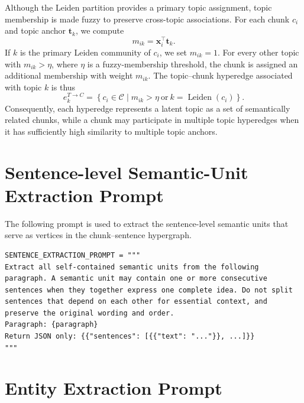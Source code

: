 \documentclass[a4paper,fleqn]{cas-dc}
\begin{document}
Although the Leiden partition provides a primary topic assignment, topic membership is made fuzzy to preserve cross-topic associations. For each chunk $c_i$ and topic anchor $\mathbf{t}_k$, we compute
\begin{equation}
m_{ik}=\mathbf{x}_i^{\top}\mathbf{t}_k.
\end{equation}
If $k$ is the primary Leiden community of $c_i$, we set $m_{ik}=1$. For every other topic with $m_{ik}>\eta$, where $\eta$ is a fuzzy-membership threshold, the chunk is assigned an additional membership with weight $m_{ik}$. The topic--chunk hyperedge associated with topic $k$ is thus
\begin{equation}
e_k^{T\rightarrow C}=\left\{c_i\in\mathcal{C}\mid m_{ik}>\eta\ \text{or}\ k=\operatorname{Leiden}(c_i)\right\}.
\end{equation}
Consequently, each hyperedge represents a latent topic as a set of semantically related chunks, while a chunk may participate in multiple topic hyperedges when it has sufficiently high similarity to multiple topic anchors.

\section{Sentence-level Semantic-Unit Extraction Prompt}
\label{app:sentence_extraction_prompt}

The following prompt is used to extract the sentence-level semantic units that serve as vertices in the chunk--sentence hypergraph.
\begin{lstlisting}
SENTENCE_EXTRACTION_PROMPT = """
Extract all self-contained semantic units from the following paragraph. A semantic unit may contain one or more consecutive sentences when they together express one complete idea. Do not split sentences that depend on each other for essential context, and preserve the original wording and order.
Paragraph: {paragraph}
Return JSON only: {{"sentences": [{{"text": "..."}}, ...]}}
"""
\end{lstlisting}

\section{Entity Extraction Prompt}
\label{app:entity_extraction_prompt}
\end{document}
